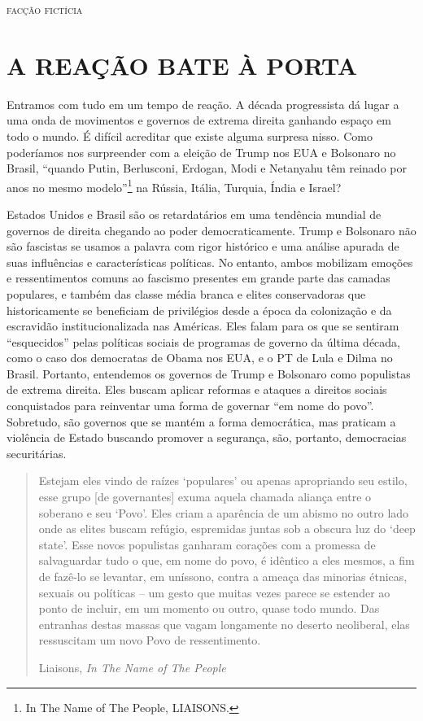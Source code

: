 
\hfill{}\textsc{facção fictícia}

\bigskip

\section{A REAÇÃO BATE À PORTA}

Entramos com tudo em um tempo de reação. A década progressista dá lugar a uma onda de movimentos e governos de extrema direita ganhando espaço em todo o mundo. É difícil acreditar que existe alguma surpresa nisso. Como poderíamos nos surpreender com a eleição de Trump nos EUA e Bolsonaro no Brasil, “quando Putin, Berlusconi, Erdogan, Modi e Netanyahu têm reinado por anos no mesmo modelo”\footnote{In The Name of The People, LIAISONS.} na Rússia, Itália, Turquia, Índia e Israel?

Estados Unidos e Brasil são os retardatários em uma tendência mundial de governos de direita chegando ao poder democraticamente. Trump e Bolsonaro não são fascistas se usamos a palavra com rigor histórico e uma análise apurada de suas influências e características políticas. No entanto, ambos mobilizam emoções e ressentimentos comuns ao fascismo presentes em grande parte das camadas populares, e também das classe média branca e elites conservadoras que historicamente se beneficiam de privilégios desde a época da colonização e da escravidão institucionalizada nas Américas. Eles falam para os que se sentiram “esquecidos” pelas políticas sociais de programas de governo da última década, como o caso dos democratas de Obama nos EUA, e o PT de Lula e Dilma no Brasil. Portanto, entendemos os governos de Trump e Bolsonaro como populistas de extrema direita. Eles buscam aplicar reformas e ataques a direitos sociais conquistados para reinventar uma forma de governar “em nome do povo”. Sobretudo, são governos que se mantém a forma democrática, mas praticam a violência de Estado buscando promover a segurança, são, portanto, democracias securitárias.

\begin{quote}
Estejam eles vindo de raízes ‘populares’ ou apenas apropriando seu estilo, esse grupo [de governantes] exuma aquela chamada aliança entre o soberano e seu ‘Povo’. Eles criam a aparência de um abismo no outro lado onde as elites buscam refúgio, espremidas juntas sob a obscura luz do ‘deep state’. Esse novos populistas ganharam corações com a promessa de salvaguardar tudo o que, em nome do povo, é idêntico a eles mesmos, a fim de fazê-lo se levantar, em uníssono, contra a ameaça das minorias étnicas, sexuais ou políticas – um gesto que muitas vezes parece se estender ao ponto de incluir, em um momento ou outro, quase todo mundo. Das entranhas destas massas que vagam longamente no deserto neoliberal, elas ressuscitam um novo Povo de ressentimento.

Liaisons, \emph{In The Name of The People}
\end{quote}

